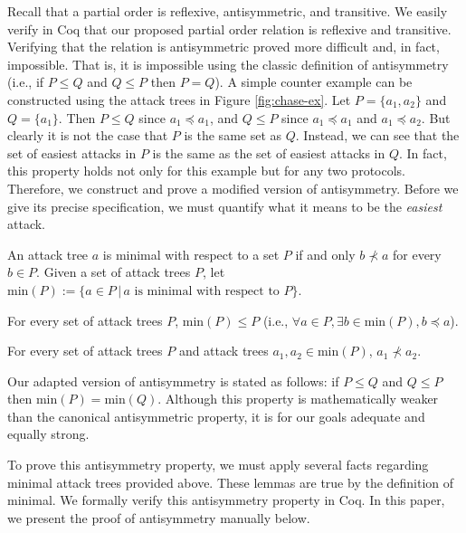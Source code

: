 \documentclass[runningheads]{llncs}
\theoremstyle{definition}
\begin{document}
Recall that a partial order is reflexive, antisymmetric, and
transitive. We easily verify in Coq that our proposed partial order
relation is reflexive and transitive. Verifying that the relation is
antisymmetric proved more difficult and, in fact, impossible. That is,
it is impossible using the classic definition of antisymmetry (i.e.,
if $P \le Q$ and $Q \le P$ then $P = Q$). A simple counter example can
be constructed using the attack trees in Figure
\ref{fig:chase-ex}. Let $P = \{a_1,a_2\}$ and $Q = \{a_1\}$. Then $P
\le Q$ since $a_1 \preceq a_1$, and $Q \le P$ since $a_1 \preceq a_1$
and $a_1 \preceq a_2$. But clearly it is not the case that $P$ is the
same set as $Q$. Instead, we can see that the set of easiest attacks
in $P$ is the same as the set of easiest attacks in $Q$. In fact, this
property holds not only for this example but for any two
protocols. Therefore, we construct and prove a modified version of
antisymmetry. Before we give its precise specification, we must
quantify what it means to be the \emph{easiest} attack. 

\begin{definition}
  An attack tree $a$ is minimal with respect to a set $P$ if and only
  $b \nprec a$ for every $b \in P$. Given a set of attack trees $P$,
  let $\text{min}(P) := \{a \in P \,|\, a \text{ is minimal with
    respect to } P \}$. 
\end{definition}

\begin{lemma}
  For every set of attack trees $P$, $\text{min}(P) \le P$ (i.e.,
  $\forall a \in P, \exists b \in \text{min}(P), b \preceq a$). 
\end{lemma}

\begin{lemma}
  For every set of attack trees $P$ and attack trees $a_1, a_2 \in
  \text{min}(P)$, $a_1 \nprec a_2$. 
\end{lemma}

Our adapted version of antisymmetry is stated as follows: if $P \le Q$
and $Q \le P$ then $\text{min}(P) = \text{min}(Q)$. Although this
property is mathematically weaker than the canonical antisymmetric
property, it is for our goals adequate and equally strong. 

To prove this antisymmetry property, we must apply several facts regarding
minimal attack trees provided above. These lemmas are true by the
definition of minimal. We formally verify this antisymmetry property in Coq.
In this paper, we present the proof of antisymmetry manually below. 
\end{document}
